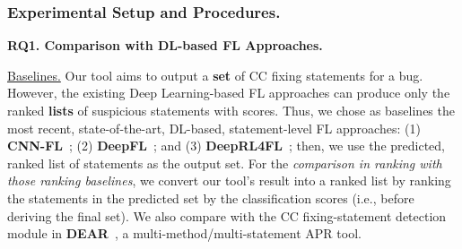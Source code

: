 \subsubsection{Experimental Setup and Procedures.\\}

{\bf RQ1. Comparison with DL-based FL Approaches.}

\underline{Baselines.}
Our tool aims to output a {\bf set} of CC fixing
statements for a bug. However, the existing Deep Learning-based FL
approaches can produce only the ranked {\bf lists} of suspicious
statements with scores. Thus, we chose as baselines the most
recent, state-of-the-art, DL-based, statement-level FL approaches:
(1) \textbf{CNN-FL}~\cite{zhang2019cnn}; (2) {\bf
DeepFL}~\cite{DeepFL}; and (3) {\bf DeepRL4FL}~\cite{icse21-fl}; then,
we use the predicted, ranked list of statements as the output set.
For the {\em comparison in ranking with those ranking baselines}, we convert our
tool's result into a ranked list by ranking the statements in the
predicted set by the classification scores (i.e., before deriving the
final set). We also compare with the CC fixing-statement detection module
in {\bf DEAR}~\cite{icse22}, a multi-method/multi-statement APR tool.







